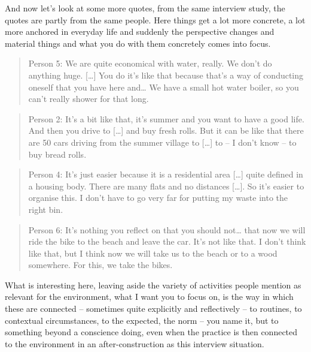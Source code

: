 ﻿\documentclass[a4paper,
fontsize=11pt,
oneside,
numbers=noperiodatend,
parskip=half-,
bibliography=totoc,
final
]{scrartcl}
\begin{document}
And now let's look at some more quotes, from the same interview study,
the quotes are partly from the same people. Here things get a lot more
concrete, a lot more anchored in everyday life and suddenly the
perspective changes and material things and what you do with them
concretely comes into focus.

\begin{quote}
Person 5: We are quite economical with water, really. We don't do
anything huge. {[}\ldots{}{]} You do it's like that because that's a way
of conducting oneself that you have here and\ldots{} We have a small hot
water boiler, so you can't really shower for that long.
\end{quote}

\begin{quote}
Person 2: It's a bit like that, it's summer and you want to have a good
life. And then you drive to {[}\ldots{}{]} and buy fresh rolls. But it
can be like that there are 50 cars driving from the summer village to
{[}\ldots{}{]} to -- I don't know -- to buy bread rolls.
\end{quote}

\begin{quote}
Person 4: It's just easier because it is a residential area
{[}\ldots{}{]} quite defined in a housing body. There are many flats and
no distances {[}\ldots{}{]}. So it's easier to organise this. I don't
have to go very far for putting my waste into the right bin.
\end{quote}

\begin{quote}
Person 6: It's nothing you reflect on that you should not\ldots{} that
now we will ride the bike to the beach and leave the car. It's not like
that. I don't think like that, but I think now we will take us to the
beach or to a wood somewhere. For this, we take the bikes.
\end{quote}

What is interesting here, leaving aside the variety of activities people
mention as relevant for the environment, what I want you to focus on, is
the way in which these are connected -- sometimes quite explicitly and
reflectively -- to routines, to contextual circumstances, to the
expected, the norm -- you name it, but to something beyond a conscience
doing, even when the practice is then connected to the environment in an
after-construction as this interview situation.
\end{document}
